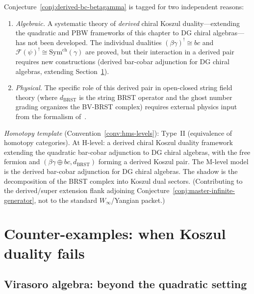 \begin{remark}[Scope]\label{rem:scope-curved-koszul}
Conjecture~\ref{conj:derived-bc-betagamma} is tagged
\ClaimStatusConjectured{} for two independent reasons:
\begin{enumerate}
\item \emph{Algebraic.}  A systematic theory of \emph{derived} chiral
  Koszul duality---extending the quadratic and PBW frameworks of
  this chapter to DG chiral algebras---has not been developed.
  The individual dualities $(\beta\gamma)^! \cong bc$ and
  $\mathcal{F}(\psi)^! \cong \mathrm{Sym}^{\mathrm{ch}}(\gamma)$
  are proved, but their interaction in a derived pair requires new
  constructions (derived bar-cobar adjunction for DG chiral algebras,
  extending Section~\ref{sec:counter-examples}).
\item \emph{Physical.}  The specific role of this derived pair in
  open-closed string field theory (where $d_{\mathrm{BRST}}$ is the
  string BRST operator and the ghost number grading organizes the
  BV-BRST complex) requires external physics input from the
  formalism of~\cite{Zwi93}.
\end{enumerate}

\emph{Homotopy template} (Convention~\ref{conv:hms-levels}): Type~II
(equivalence of homotopy categories).  At H-level: a derived chiral
Koszul duality framework extending the quadratic bar-cobar adjunction
to DG chiral algebras, with the free fermion and $(\beta\gamma \oplus bc,
d_{\mathrm{BRST}})$ forming a derived Koszul pair.  The M-level model
is the derived bar-cobar adjunction for DG chiral algebras.  The shadow
is the decomposition of the BRST complex into Koszul dual sectors.
(Contributing to the derived/super extension flank adjoining
Conjecture~\ref{conj:master-infinite-generator}, not to the standard
$W_\infty$/Yangian packet.)
\end{remark}


\section{Counter-examples: when Koszul duality fails}
\label{sec:counter-examples}

\subsection{Virasoro algebra: beyond the quadratic setting}
\label{subsec:virasoro-non-example}

